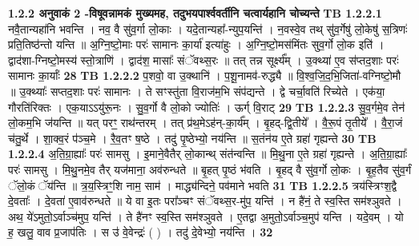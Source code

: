 \documentclass[17pt]{extarticle}
\begin{document}
                \textbf{ 1.2.2      अनुवाकं   2 -विषूवन्नामकं मुख्यमह, तदुभयपार्श्ववर्तीनि चत्वार्यहानि चोच्यन्ते} \newline
                                \textbf{ TB 1.2.2.1} \newline
                  नवै॒तान्यहा॑नि भवन्ति । नव॒ वै सु॑व॒र्गा लो॒काः । यदे॒तान्यहा᳚-न्युप॒यन्ति॑ । न॒वस्वे॒व तथ् सु॑व॒र्गेषु॑ लो॒केषु॑ स॒त्रिणः॑ प्रति॒तिष्ठ॑न्तो यन्ति ॥ अ॒ग्नि॒ष्टो॒माः परः॑ सामानः का॒र्या॑ इत्या॑हुः । अ॒ग्नि॒ष्टो॒मस॑मिंतः सुव॒र्गो लो॒क इति॑ । द्वाद॑शा-ग्निष्टो॒मस्य॑ स्तो॒त्राणि॑ । द्वाद॑श॒ मासाः᳚ संॅवथ्स॒रः ॥ तत् तन्न सूर्क्ष्य᳚म् । उ॒क्थ्या॑ ए॒व स॑प्तद॒शाः परः॑ सामानः का॒र्याः᳚ \textbf{ 28} \newline
                  \newline
                                \textbf{ TB 1.2.2.2} \newline
                  प॒शवो॒ वा उ॒क्थानि॑ । प॒शू॒नामव॑-रुद्ध्यै ॥ वि॒श्व॒जि॒द॒भि॒जिता॑-वग्निष्टो॒मौ ॥ उ॒क्थ्याः᳚ सप्तद॒शाः परः॑ सामानः । ते सꣳस्तु॑ता वि॒राज॑म॒भि संप॑द्यन्ते । द्वे चर्चा॒वति॑ रिच्येते । एक॑या॒ गौरति॑रिक्तः । एक॒याऽऽयु॑रू॒नः । सु॒व॒र्गो वै लो॒को ज्योतिः॑ । ऊर्ग् वि॒राट् \textbf{ 29} \newline
                  \newline
                                \textbf{ TB 1.2.2.3} \newline
                  सु॒व॒र्गमे॒व तेन॑ लो॒कम॒भि ज॑यन्ति ॥ यत् परꣳ॒॒ राथ॑न्तरम् । तत् प्र॑थ॒मेऽह॑न्-का॒र्य᳚म् । बृ॒हद्-द्वि॒तीये᳚ । वै॒रू॒पं तृ॒तीये᳚ । वै॒रा॒जं च॑तु॒र्थे । शा॒क्व॒रं प॑ञ्च॒मे । रै॒व॒तꣳ ष॒ष्ठे । तदु॑ पृ॒ष्ठेभ्यो॒ नय॑न्ति ॥ स॒तंन॑य ए॒ते ग्रहा॑ गृह्यन्ते \textbf{ 30} \newline
                  \newline
                                \textbf{ TB 1.2.2.4} \newline
                  अ॒ति॒ग्रा॒ह्याः᳚ परः॑ सामसु । इ॒माने॒वैतैर् लो॒कान्थ् संत॑न्वन्ति ॥ मि॒थु॒ना ए॒ते ग्रहा॑ गृह्यन्ते । अ॒ति॒ग्रा॒ह्याः᳚ परः॑ सामसु । मि॒थु॒नमे॒व तैर् यज॑माना॒ अव॑रुन्धते ॥ बृ॒हत् पृ॒ष्ठं भ॑वति । बृ॒हद् वै सु॑व॒र्गो लो॒कः । बृ॒ह॒तैव सु॑व॒र्गं ॅलो॒कं ॅय॑न्ति ॥ त्र॒य॒स्त्रिꣳ॒॒शि नाम॒ साम॑ । माद्ध्य॑न्दिने॒ पव॑माने भवति \textbf{ 31} \newline
                  \newline
                                \textbf{ TB 1.2.2.5} \newline
                  त्रय॑स्त्रिꣳश॒द्वै दे॒वताः᳚ । दे॒वता॑ ए॒वाव॑रुन्धते ॥ ये वा इ॒तः परा᳚ञ्चꣳ संॅवथ्स॒र-मु॑प॒ यन्ति॑ । न है॑नं॒ ते स्व॒स्ति सम॑श्ञुवते । अथ॒ ये॑ऽमुतो॒ऽर्वाञ्च॑मुप॒ यन्ति॑ । ते है॑नꣳ स्व॒स्ति सम॑श्ञुवते । ए॒तद्वा अ॒मुतो॒ऽर्वाञ्च॒मुप॑ यन्ति । यदे॒वम् । यो ह॒ खलु॒ वाव प्र॒जाप॑तिः । स उ॑ वे॒वेन्द्रः॑ ( ) । तदु॑ दे॒वेभ्यो॒ नय॑न्ति । \textbf{ 32} \newline
\end{document}

